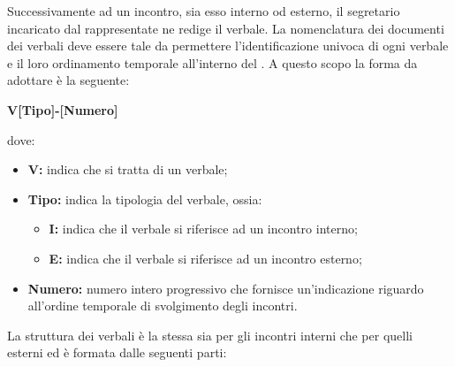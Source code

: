 				Successivamente ad un incontro, sia esso interno od esterno, il segretario incaricato dal rappresentate ne redige il verbale.
				\newline
				La nomenclatura dei documenti dei verbali deve essere tale da permettere l'identificazione univoca di ogni verbale e il loro ordinamento temporale all'interno del . A questo scopo la forma da adottare è la seguente:
				\centerline{\textbf{V[Tipo]-[Numero]}}
				dove:
				\begin{itemize}
					\item \textbf{V:} indica che si tratta di un verbale;
					\item \textbf{Tipo:} indica la tipologia del verbale, ossia:
					\begin{itemize}
						\item \textbf{I:} indica che il verbale si riferisce ad un incontro interno;
						\item \textbf{E:} indica che il verbale si riferisce ad un incontro esterno;
					\end{itemize} 
					\item \textbf{Numero:} numero intero progressivo che fornisce un'indicazione riguardo all'ordine temporale di svolgimento degli incontri.
				\end{itemize}
				La struttura dei verbali è la stessa sia per gli incontri interni che per quelli esterni ed è formata dalle seguenti parti:
